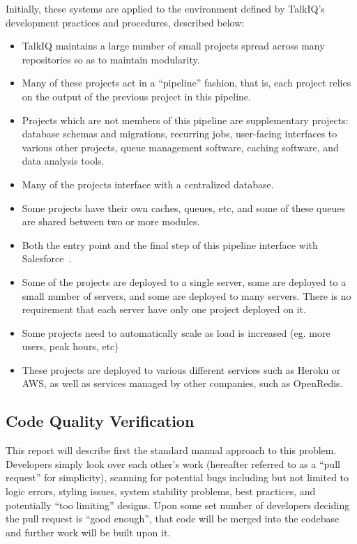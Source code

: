\documentclass[12pt]{article}
\begin{document}
Initially, these systems are applied to the environment defined by TalkIQ's development practices and procedures, described below:
\begin{itemize}
\item TalkIQ maintains a large number of small projects spread across many repositories so as to maintain modularity.
\item Many of these projects act in a ``pipeline'' fashion, that is, each project relies on the output of the previous project in this pipeline.
\item Projects which are not members of this pipeline are supplementary projects: database schemas and migrations, recurring jobs, user-facing interfaces to various other projects, queue management software, caching software, and data analysis tools.
\item Many of the projects interface with a centralized database.
\item Some projects have their own caches, queues, etc, and some of these queues are shared between two or more modules.
\item Both the entry point and the final step of this pipeline interface with Salesforce~\cite{talkiq}.
\item Some of the projects are deployed to a single server, some are deployed to a small number of servers, and some are deployed to many servers. There is no requirement that each server have only one project deployed on it.
\item Some projects need to automatically scale as load is increased (eg. more users, peak hours, etc)
\item These projects are deployed to various different services such as Heroku or AWS, as well as services managed by other companies, such as OpenRedis.
\end{itemize}

\subsection{Code Quality Verification}
This report will describe first the standard manual approach to this problem. Developers simply look over each other's work (hereafter referred to as a ``pull request'' for simplicity), scanning for potential bugs including but not limited to logic errors, styling issues, system stability problems, best practices, and potentially ``too limiting'' designs. Upon some set number of developers deciding the pull request is ``good enough'', that code will be merged into the codebase and further work will be built upon it.
\end{document}

